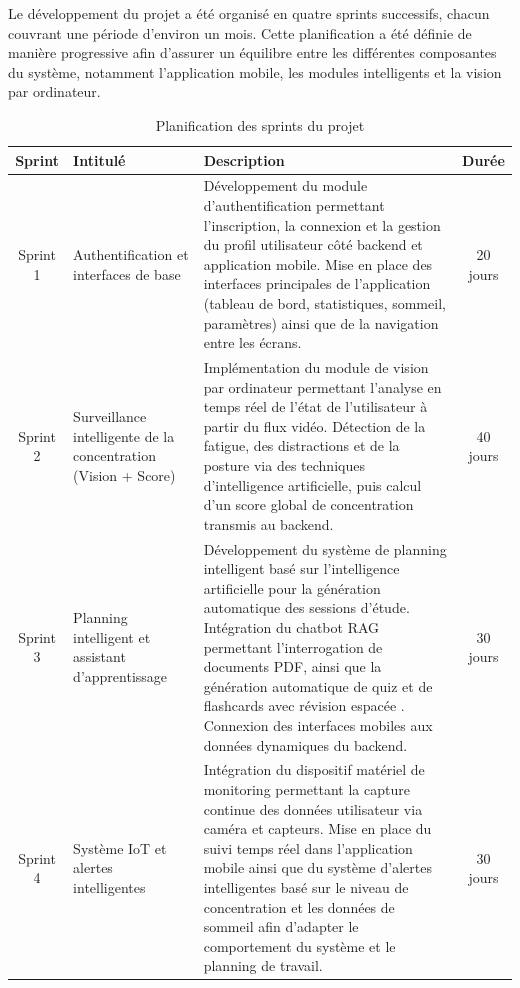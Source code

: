 Le développement du projet a été organisé en quatre sprints successifs, chacun couvrant une période d’environ un mois. Cette planification a été définie de manière progressive afin d’assurer un équilibre entre les différentes composantes du système, notamment l’application mobile, les modules intelligents et la vision par ordinateur.
{\singlespacing
\begin{table}[H]
\centering
\small
\renewcommand{\arraystretch}{1.2}
\setlength{\tabcolsep}{5pt}

\begin{tabularx}{\textwidth}{|c|p{3.8cm}|X|c|}
\hline
\textbf{Sprint} & \textbf{Intitulé} & \textbf{Description} & \textbf{Durée} \\
\hline

Sprint 1 & 
Authentification et interfaces de base & 
Développement du module d’authentification permettant l’inscription, la connexion et la gestion du profil utilisateur côté backend et application mobile. Mise en place des interfaces principales de l’application (tableau de bord, statistiques, sommeil, paramètres) ainsi que de la navigation entre les écrans. &
20 jours \\ \hline

Sprint 2 & 
Surveillance intelligente de la concentration (Vision + Score) & 
Implémentation du module de vision par ordinateur permettant l’analyse en temps réel de l’état de l’utilisateur à partir du flux vidéo. Détection de la fatigue, des distractions et de la posture via des techniques d’intelligence artificielle, puis calcul d’un score global de concentration transmis au backend. &
40 jours \\ \hline

Sprint 3 & 
Planning intelligent et assistant d’apprentissage & 
Développement du système de planning intelligent basé sur l’intelligence artificielle pour la génération automatique des sessions d’étude. Intégration du chatbot RAG permettant l’interrogation de documents PDF, ainsi que la génération automatique de quiz et de flashcards avec révision espacée . Connexion des interfaces mobiles aux données dynamiques du backend. &
30 jours \\ \hline

Sprint 4 & 
Système IoT et alertes intelligentes & 
Intégration du dispositif matériel de monitoring permettant la capture continue des données utilisateur via caméra et capteurs. Mise en place du suivi temps réel dans l’application mobile ainsi que du système d’alertes intelligentes basé sur le niveau de concentration et les données de sommeil afin d’adapter le comportement du système et le planning de travail. &
30 jours \\ \hline

\end{tabularx}

\caption{Planification des sprints du projet}
\label{tab:sprints_final}
\end{table}
}
